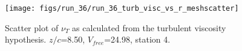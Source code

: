 \begin{figure}[H]
\centering
\texttt{[image: figs/run\_36/run\_36\_turb\_visc\_vs\_r\_meshscatter]}
\caption{Scatter plot of $\nu_T$ as calculated from the turbulent viscosity hypothesis. $z/c$=8.50, $V_{free}$=24.98, station 4.}
\label{fig:run_36_turb_visc_vs_r_meshscatter}
\end{figure}



